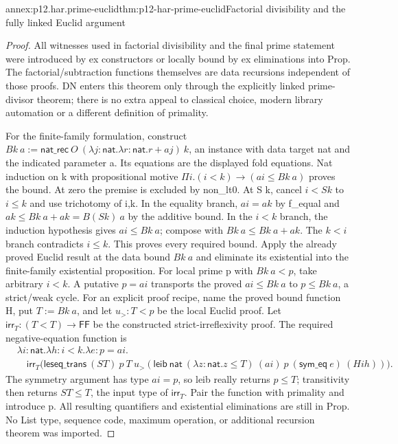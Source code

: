 \begin{annexitem}{annex:p12.har.prime-euclid}{thm:p12-har-prime-euclid}{Factorial divisibility and the fully linked Euclid argument}
\begin{proof}
All witnesses used in factorial divisibility and the final prime
statement were introduced by ex constructors or locally bound by ex
eliminations into Prop. The factorial/subtraction functions themselves
are data recursions independent of those proofs. DN enters this theorem
only through the explicitly linked prime-divisor theorem; there is no
extra appeal to classical choice, modern library automation or a
different definition of primality.

For the finite-family formulation, construct
\(B k\ a:=\mathsf{nat\_rec}\ O\
(\lambda j:\mathsf{nat}.\lambda r:\mathsf{nat}.r+a j)\ k\),
an instance with data target nat and the indicated parameter a.
Its equations are the displayed fold equations. Nat induction on k
with propositional motive
\(\Pi i.(i<k)\to(a i\le B k\ a)\) proves the bound.
At zero the premise is excluded by non_lt0.
At S k, cancel \(i<S k\) to \(i\le k\) and use trichotomy of
i,k. In the equality branch, \(a i=a k\) by f_equal and
\(a k\le B k\ a+a k=B(S k)\ a\) by the additive bound.
In the \(i<k\) branch, the induction hypothesis gives
\(a i\le B k\ a\); compose with
\(B k\ a\le B k\ a+a k\). The \(k<i\) branch contradicts
\(i\le k\). This proves every required bound.
Apply the already proved Euclid result at the data bound \(B k\ a\)
and eliminate its existential into the finite-family existential
proposition. For local prime p with \(B k\ a<p\), take arbitrary
\(i<k\). A putative \(p=a i\) transports the proved
\(a i\le B k\ a\) to \(p\le B k\ a\), a strict/weak cycle.
For an explicit proof recipe, name the proved bound function H,
put \(T:=B k\ a\), and let \(u_{>}:T<p\) be the local Euclid
proof. Let \(\mathsf{irr}_T:(T<T)\to\mathsf{FF}\) be the constructed
strict-irreflexivity proof. The required negative-equation function is
\[
\begin{aligned}
 &\lambda i:\mathsf{nat}.\lambda h:i<k.\lambda e:p=a i.\\
 &\quad\mathsf{irr}_T\bigl(
  \mathsf{leseq\_trans}\ (S T)\ p\ T\ u_{>}
   (\mathsf{leib}\ \mathsf{nat}\ (\lambda z:\mathsf{nat}.z\le T)
       \ (a i)\ p\ (\mathsf{sym\_eq}\ e)\ (H i h))\bigr).
\end{aligned}
\]
The symmetry argument has type \(a i=p\), so leib really returns
\(p\le T\); transitivity then returns \(S T\le T\), the input
type of \(\mathsf{irr}_T\). Pair the function with primality and
introduce p. All resulting quantifiers
and existential eliminations are still in Prop. No List type, sequence
code, maximum operation, or additional recursion theorem was imported.
\end{proof}
\end{annexitem}
